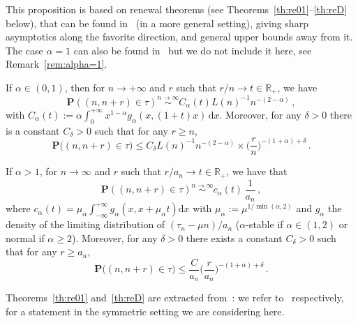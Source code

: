 \documentclass[AHL,Unicode,longabstracts]{cedram}
\newcommand{\ga}{\alpha}
\newcommand{\gd}{\delta}
\newcommand{\dd}{\mathrm{d}}
\newcommand{\bP}{\ensuremath{\mathbf{P}}}
\newcommand{\bbR}{\ensuremath{\mathbb{R}}}
\begin{document}
\begin{appendix}
This proposition is based on renewal theorems (see Theorems~\ref{th:re01}--\ref{th:reD} below), that can be found in~\cite{cf:B} (in a more general setting), giving sharp asymptotics along the favorite direction, and general upper bounds away from it. The case $\ga=1$ can also be found in~\cite{cf:B} but we do not include it here, see Remark~\ref{rem:alpha=1}.


\begin{theo}\label{th:re01}
If $\ga \in (0,1)$, then for $n\to+\infty $ and $r$ such that $r/n \to t \in \bbR_+$, we have
\begin{equation}\label{eq:D01}
\bP \left((n,n+r) \in \tau \right) \stackrel{n \to \infty}\sim C_{\ga}(t) L(n)^{-1} n^{-(2-\ga)}\,,
\end{equation}
with $C_{\ga}(t) := \ga \int_{0}^{+ \infty} x^{1- \ga} g_\ga (x, (1+t) x)\,\dd x$. Moreover, for any $\gd>0$ there is a constant $C_{\gd}>0$ such that for any $r\geq n$,
\begin{equation}
\bP\big((n,n+r)\in\tau \big) \leq C_{\gd} L(n)^{-1} n^{-(2-\ga)} \times \Big(\frac{r}{n} \Big)^{-(1+\ga) +\gd}\,.
\end{equation}
\end{theo}



\begin{theo}\label{th:reD}
If $\ga> 1$, for $n \to \infty$ and $r$ such that $r/a_n \to t \in \bbR_+$, we have that
\begin{equation}
\bP \left((n,n+r) \in \tau \right) \stackrel{n \to \infty}\sim c_{\ga}(t)\,\frac{1}{a_n}\,,
\end{equation}
where $c_{\ga}(t) = \mu_\ga \int_{- \infty}^{+ \infty} g_\ga (x,x+\mu_\ga t) \dd x$ with $\mu_\ga := \mu^{1/\min(\ga,2)}$ and $g_{\ga}$ the density of the limiting distribution of $(\tau_n -\mu n)/a_n$ ($\alpha$-stable if $\ga\in(1,2)$ or normal if $\ga\geq 2$). Moreover, for any $\gd>0$ there exists a constant $C_{\gd}>0$ such that for any $r\geq a_n$,
\begin{equation}\label{eq:offdiag}
\bP\big((n, n+r) \in \tau \big) \leq \frac{C}{a_n} \Big(\frac{r}{a_n} \Big)^{-(1+\ga) +\gd}\,.
\end{equation}
\end{theo}

Theorems~\ref{th:re01} and~\ref{th:reD} are extracted from~\cite[Theorems~3.1, 4.1 and Theorems~3.3, 4.2 respectively]{cf:B}: we refer to~\cite[Equations~(3.4), (4.2), (3.7), (4.5)]{cf:B} respectively, for a statement in the symmetric setting we are considering here.
\\[-0.5em]


\end{appendix}
\end{document}
